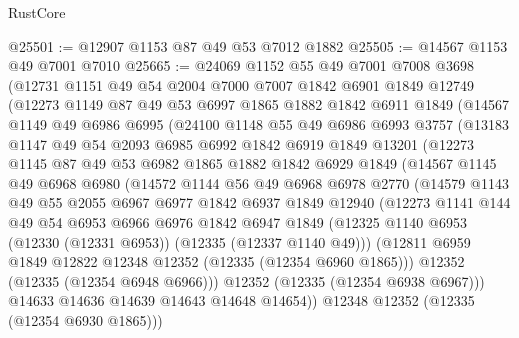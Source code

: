 \begin{lexlean}{RustCore}
\begin{coremodule}
@25501 := @12907 @1153 @87 @49 @53 @7012 @1882
@25505 := @14567 @1153 @49 @7001 @7010
@25665 := @24069
    @1152
    @55
    @49
    @7001
    @7008
    @3698
    (@12731
      @1151
      @49
      @54
      @2004
      @7000
      @7007
      @1842
      @6901
      @1849
      @12749
      (@12273
        @1149
        @87
        @49
        @53
        @6997
        @1865
        @1882
        @1842
        @6911
        @1849
        (@14567
          @1149
          @49
          @6986
          @6995
          (@24100
            @1148
            @55
            @49
            @6986
            @6993
            @3757
            (@13183
              @1147
              @49
              @54
              @2093
              @6985
              @6992
              @1842
              @6919
              @1849
              @13201
              (@12273
                @1145
                @87
                @49
                @53
                @6982
                @1865
                @1882
                @1842
                @6929
                @1849
                (@14567
                  @1145
                  @49
                  @6968
                  @6980
                  (@14572
                    @1144
                    @56
                    @49
                    @6968
                    @6978
                    @2770
                    (@14579
                      @1143
                      @49
                      @55
                      @2055
                      @6967
                      @6977
                      @1842
                      @6937
                      @1849
                      @12940
                      (@12273
                        @1141
                        @144
                        @49
                        @54
                        @6953
                        @6966
                        @6976
                        @1842
                        @6947
                        @1849
                        (@12325 @1140 @6953 (@12330 (@12331 @6953)) (@12335 (@12337 @1140 @49)))
                        (@12811 @6959 @1849 @12822 @12348 @12352 (@12335 (@12354 @6960 @1865)))
                        @12352
                        (@12335 (@12354 @6948 @6966)))
                      @12352
                      (@12335 (@12354 @6938 @6967)))
                    @14633
                    @14636
                    @14639
                    @14643
                    @14648
                    @14654))
                @12348
                @12352
                (@12335 (@12354 @6930 @1865)))

\end{coremodule}
\end{lexlean}
